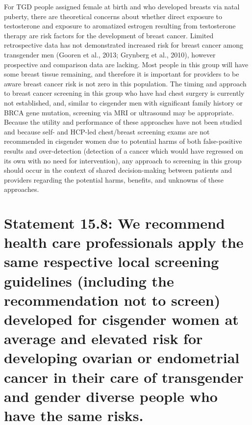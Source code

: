 \documentclass[
]{book}
\begin{document}
For TGD people assigned female at birth and
who developed breasts via natal puberty, there are
theoretical concerns about whether direct exposure
to testosterone and exposure to aromatized estrogen resulting from testosterone therapy are risk
factors for the development of breast cancer.
Limited retrospective data has not demonstrated
increased risk for breast cancer among transgender
men (Gooren et al., 2013; Grynberg et al., 2010),
however prospective and comparison data are
lacking. Most people in this group will have some
breast tissue remaining, and therefore it is important for providers to be aware breast cancer risk
is not zero in this population. The timing and
approach to breast cancer screening in this group
who have had chest surgery is currently not established, and, similar to cisgender men with significant family history or BRCA gene mutation,
screening via MRI or ultrasound may be appropriate. Because the utility and performance of
these approaches have not been studied and
because self- and HCP-led chest/breast screening
exams are not recommended in cisgender women
due to potential harms of both false-positive
results and over-detection (detection of a cancer
which would have regressed on its own with no
need for intervention), any approach to screening
in this group should occur in the context of
shared decision-making between patients and providers regarding the potential harms, benefits, and
unknowns of these approaches.

\hypertarget{statement-15.8-we-recommend-health-care-professionals-apply-the-same-respective-local-screening-guidelines-including-the-recommendation-not-to-screen-developed-for-cisgender-women-at-average-and-elevated-risk-for-developing-ovarian-or-endometrial-cancer-in-their-care-of-transgender-and-gender-diverse-people-who-have-the-same-risks.}{%
\section*{Statement 15.8: We recommend health care professionals apply the same respective local screening guidelines (including the recommendation not to screen) developed for cisgender women at average and elevated risk for developing ovarian or endometrial cancer in their care of transgender and gender diverse people who have the same risks.}\label{statement-15.8-we-recommend-health-care-professionals-apply-the-same-respective-local-screening-guidelines-including-the-recommendation-not-to-screen-developed-for-cisgender-women-at-average-and-elevated-risk-for-developing-ovarian-or-endometrial-cancer-in-their-care-of-transgender-and-gender-diverse-people-who-have-the-same-risks.}}
\end{document}
